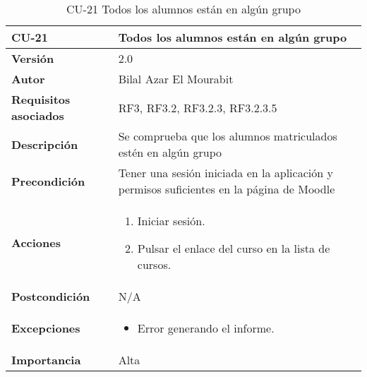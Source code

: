 \begin{table}[H]
	\centering
	\begin{tabularx}{\linewidth}{ p{} p{} }
		\toprule
		\textbf{CU-21}    & \textbf{Todos los alumnos están en algún grupo}\\
		\toprule
		\textbf{Versión}              & 2.0    \\
		\textbf{Autor}                & Bilal Azar El Mourabit \\
		\textbf{Requisitos asociados} & RF3, RF3.2, RF3.2.3, RF3.2.3.5 \\
		\textbf{Descripción}          & Se comprueba que los alumnos matriculados estén en algún grupo\\
    		\textbf{Precondición}         & Tener una sesión iniciada en la aplicación y permisos suficientes en la página de Moodle\\
		\textbf{Acciones}             & 
		\begin{enumerate}
			\def\labelenumi{\arabic{enumi}.}
			\tightlist
			\item Iniciar sesión.
            \item Pulsar el enlace del curso en la lista de cursos. 
		\end{enumerate}\\
		\textbf{Postcondición}        & N/A \\
		\textbf{Excepciones}          & \begin{itemize}
		    \item Error generando el informe.
		\end{itemize} \\
		\textbf{Importancia}          & Alta \\
		\bottomrule
	\end{tabularx}
	\caption{CU-21 Todos los alumnos están en algún grupo}
\end{table}

